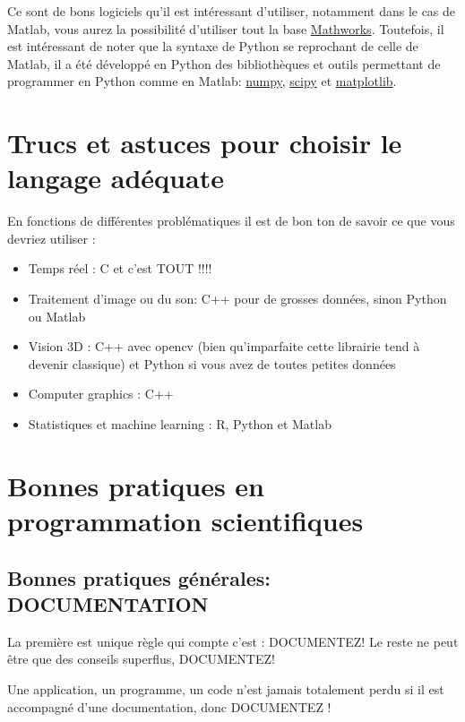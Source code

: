 Ce sont de bons logiciels qu'il est intéressant d'utiliser, notamment dans le cas de Matlab, 
vous aurez la possibilité d'utiliser tout la base \href{http://www.mathworks.fr/matlabcentral/fileexchange}{Mathworks}.
Toutefois, il est intéressant de noter que la syntaxe de Python se reprochant de celle de Matlab, il a 
été développé en Python des bibliothèques et outils permettant de programmer en Python comme en Matlab: 
\href{http://www.numpy.org/}{numpy}, \href{http://www.scipy.org/}{scipy} et \href{http://matplotlib.org/}{matplotlib}.\\



\section{Trucs et astuces pour choisir le langage adéquate}

En fonctions de différentes problématiques il est de bon ton de savoir ce que vous devriez utiliser :

\begin{itemize}
\item Temps réel : C et c'est TOUT !!!!
\item Traitement d'image ou du son: C++ pour de grosses données, sinon Python ou Matlab
\item Vision 3D : C++ avec opencv (bien qu'imparfaite cette librairie tend à devenir classique) 
et Python si vous avez de toutes petites données
\item Computer graphics : C++ 
\item Statistiques  et machine learning : R, Python et Matlab
\end{itemize}  

\section{Bonnes pratiques en programmation scientifiques}

\subsection{Bonnes pratiques générales: DOCUMENTATION}

La première est unique règle qui compte c'est : DOCUMENTEZ!
Le reste ne peut être que des conseils superflus, DOCUMENTEZ! 

Une application, un programme, un code n'est jamais totalement perdu si 
il est accompagné d'une documentation, donc DOCUMENTEZ !\\

